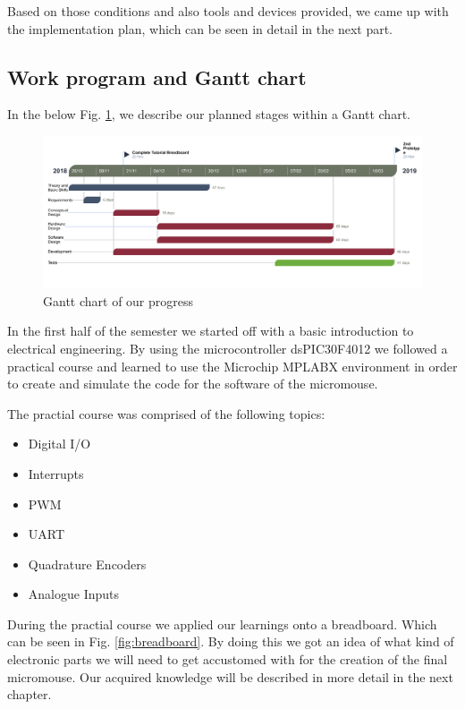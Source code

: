 Based on those conditions and also tools and devices provided, we came up with the implementation plan, which can be seen in detail in the next part.

\subsection{Work program and Gantt chart}
In the below Fig. \ref{fig:gantt}, we describe our planned stages within a Gantt chart.

\begin{figure}[H]
    \centering
    \includegraphics[width=1\textwidth]{figures/micromouse-gantt.png}
    \caption{Gantt chart of our progress}
    \label{fig:gantt}
\end{figure}

\noindent
In the first half of the semester we started off with a basic introduction to electrical engineering. By using the microcontroller dsPIC30F4012 we followed a practical course and learned to use the Microchip MPLABX environment in order to create and simulate the code for the software of the micromouse.

\noindent
The practial course was comprised of the following topics:
\begin{itemize}
    \item Digital I/O
    \item Interrupts
    \item PWM
    \item UART
    \item Quadrature Encoders
    \item Analogue Inputs
\end{itemize}

\noindent
During the practial course we applied our learnings onto a breadboard. Which can be seen in Fig. \ref{fig:breadboard}. By doing this we got an idea of what kind of electronic parts we will need to get accustomed with for the creation of the final micromouse. Our acquired knowledge will be described in more detail in the next chapter.

